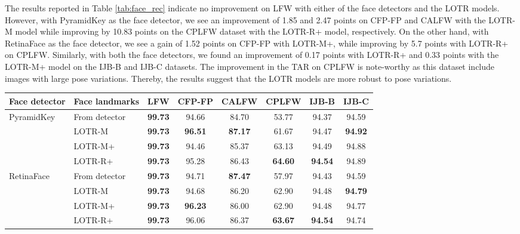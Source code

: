 \documentclass[journal]{IEEEtran}
\begin{document}
The results reported in Table \ref{tab:face_rec} indicate no improvement on LFW with either of the face detectors and the LOTR models.
However, with PyramidKey as the face detector, we see an improvement of 1.85 and 2.47 points on CFP-FP and CALFW with the LOTR-M model while improving by 10.83 points on the CPLFW dataset with the LOTR-R+ model, respectively.
On the other hand, with RetinaFace as the face detector, we see a gain of 1.52 points on CFP-FP with LOTR-M+, while improving by 5.7 points with LOTR-R+ on CPLFW.
Similarly, with both the face detectors, we found an improvement of 0.17 points with LOTR-R+ and 0.33 points with the LOTR-M+ model on the IJB-B and IJB-C datasets.
The improvement in the TAR on CPLFW is note-worthy as this dataset include images with large pose variations.
Thereby, the results suggest that the LOTR models are more robust to pose variations.

\begin{table*}
\caption{The performance (TAR @ FAR ) of face recognition on several benchmarks.}
\centering
\begin{tabular}{llcccccc}
\hline
Face detector    & Face landmarks    & LFW   & CFP-FP & CALFW & CPLFW & IJB-B & IJB-C   \\
\hline
PyramidKey       & From detector       & \textbf{99.73} & 94.66  & 84.70 & 53.77 & 94.37 & 94.59   \\
\cite{earp2019} & LOTR-M  & \textbf{99.73} & \textbf{96.51}  & \textbf{87.17} & 61.67 & 94.47 & \textbf{94.92}   \\
                 & LOTR-M+ & \textbf{99.73} & 94.46  & 85.37 & 63.13 & 94.49 & 94.88   \\
                 & LOTR-R+ & \textbf{99.73} & 95.28  & 86.43 & \textbf{64.60} & \textbf{94.54} & 94.89   \\
\hline
RetinaFace       & From detector       & \textbf{99.73} & 94.71  & \textbf{87.47} & 57.97 & 94.43 & 94.59   \\
\cite{deng2019} & LOTR-M  & \textbf{99.73} & 94.68  & 86.20 & 62.90 & 94.48 & \textbf{94.79}   \\
                 & LOTR-M+ & \textbf{99.73} & \textbf{96.23}  & 86.00 & 62.90 & 94.48 & 94.77   \\
                 & LOTR-R+ & \textbf{99.73} & 96.06  & 86.37 & \textbf{63.67} & \textbf{94.54} & 94.74   \\
\hline
\end{tabular}
\par
\label{tab:face_rec}
\end{table*}    
\end{document}
